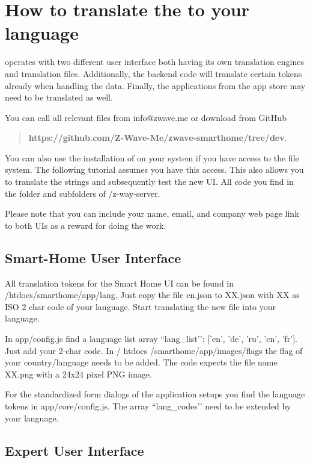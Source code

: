 \section{How to translate the \zway to your language}
\label{sec:translation}

\zway operates with two different user interface both having its own translation engines 
and translation files. Additionally, the backend code will translate certain tokens already 
when handling the data. Finally, the applications from the app store may need to be translated as well.

You can call all relevant files from info@zwave.me or download from GitHub


\begin{quote}
\textbf{https://github.com/Z-Wave-Me/zwave-smarthome/tree/dev}.
\end{quote}

You can also use the installation of \zway on your system if you have access to the file 
system. The following tutorial assumes you have this access. This also allows you to 
translate the strings and subsequently test the new UI. All \zway code you find in the 
folder and subfolders of /z-way-server.

Please note that you can include your name, email, and company web page link to both UIs 
as a reward for doing the work. 

\subsection{Smart-Home User Interface}

All translation tokens for the Smart Home UI can be found in /htdocs/smarthome/app/lang.
Just copy the file en.json to XX.json with XX as ISO 2 char code of your language. Start 
translating the new file into your language.

In app/config.js find a language list array ``lang\_list’’: ['en', 'de', 'ru', 'cn', 'fr']. 
Just add your 2-char code. In / htdocs /smarthome/app/images/flags the flag of 
your country/language needs to be added. The code expects the file name XX.png with a 24x24 pixel PNG image.

For the standardized form dialogs of the application setups you find the language 
tokens in app/core/config.js. The array ``lang\_codes’’ need to be extended by your language.

\subsection{Expert User Interface}

